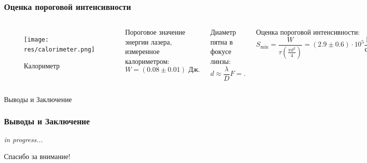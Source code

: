 \documentclass{beamer}
\begin{document}
	\begin{frame}
		\frametitle{Оценка пороговой интенсивности}
		\begin{columns}
			\begin{figure}
				\centering
				\texttt{[image: res/calorimeter.png]}
				\caption*{Калориметр}
			\end{figure}	
			Пороговое значение энергии лазера, измеренное калориметром: 
			$$W = (0.08 \pm 0.01) \text{ Дж}.$$
			
			Диаметр пятна в фокусе линзы: 
			$$d \approx \frac{\lambda}{D} F = .$$
			
			
			Оценка пороговой интенсивности: 
			$$S_{\text{min}} = \frac{W}{ \tau \left(\frac{\pi d^2}{4}\right)} = (2.9 \pm 0.6)\cdot10^5 \frac{\text{Вт}}{\text{см}^2},$$
			
			где $\tau = 40 \text{ нс}$ -- время импульса.
		\end{columns}
	\end{frame}	

	\begin{frame}[plain,c]
		
		\begin{center}
			\huge {} Выводы и Заключение
		\end{center}
		
	\end{frame}
	
	\begin{frame}
		\frametitle{Выводы и Заключение}
		
		\begin{center}
			\huge {} \textit{in progress...}
		\end{center}
		
	\end{frame}
	

	\begin{frame}[plain,c]
		
		\begin{center}
			\huge {} Спасибо за внимание!
		\end{center}
		
	\end{frame}
	
\end{document}
